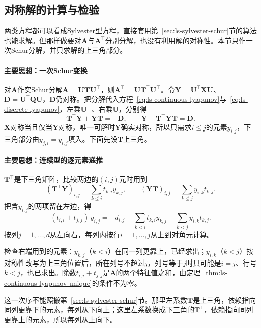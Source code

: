\subsection{对称解的计算与检验}
\label{sec:ls-lyapunov-solve}

两类方程都可以看成Sylvester型方程，直接套用第~\ref{sec:ls-sylvester-schur}节的算法也能求解。但那样做要对$\bm A$与$\bm A^\top$分别分解，也没有利用解的对称性。本节只作一次Schur分解，并只求解的上三角部分。

\paragraph{主要思想：一次Schur变换}
对$\bm A$作实Schur分解$\bm A=\bm U\bm T\bm U^\top$，则$\bm A^\top=\bm U\bm T^\top\bm U^\top$。令$\bm Y=\bm U^\top\bm X\bm U$、$\bm D=\bm U^\top\bm Q\bm U$，$\bm D$仍对称。把分解代入方程~\eqref{eq:ls-continuous-lyapunov}与~\eqref{eq:ls-discrete-lyapunov}，左乘$\bm U^\top$、右乘$\bm U$，分别得
\begin{equation}
 \bm T^\top\bm Y+\bm Y\bm T=-\bm D,\qquad
 \bm Y-\bm T^\top\bm Y\bm T=\bm D .
 \label{eq:ls-lyapunov-schur-transformed}
\end{equation}
$\bm X$对称当且仅当$\bm Y$对称，唯一可解时$\bm Y$确实对称，所以只需求$i\leq j$的元素$y_{i,j}$，下三角部分由$y_{j,i}=y_{i,j}$填入。下面先设$\bm T$上三角。

\paragraph{主要思想：连续型的逐元素递推}
$\bm T^\top$是下三角矩阵，比较两边的$(i,j)$元时用到
\[
 (\bm T^\top\bm Y)_{i,j}=\sum_{k\leq i}t_{k,i}y_{k,j},\qquad
 (\bm Y\bm T)_{i,j}=\sum_{k\leq j}y_{i,k}t_{k,j}.
\]
把含$y_{i,j}$的两项留在左边，得
\begin{equation}
 (t_{i,i}+t_{j,j})\,y_{i,j}
 =-d_{i,j}-\sum_{k<i}t_{k,i}y_{k,j}-\sum_{k<j}y_{i,k}t_{k,j}.
 \label{eq:ls-continuous-lyapunov-entry}
\end{equation}
按列$j=1,\ldots,d$从左向右，每列内按行$i=1,\ldots,j$从上到对角元计算。

检查右端用到的元素：$y_{k,j}$（$k<i$）在同一列更靠上，已经求出；$y_{i,k}$（$k<j$）按对称性改写为上三角位置后，所在列号不超过$j$，列号等于$j$时只可能是$i=j$、行号$k<j$，也已求出。除数$t_{i,i}+t_{j,j}$是$\bm A$的两个特征值之和，由定理~\ref{thm:ls-continuous-lyapunov-unique}的条件不为零。

这一次序不能照搬第~\ref{sec:ls-sylvester-schur}节。那里左系数$\bm T$是上三角，依赖指向同列更靠下的元素，每列从下向上；这里左系数换成下三角的$\bm T^\top$，依赖指向同列更靠上的元素，所以每列从上向下。

